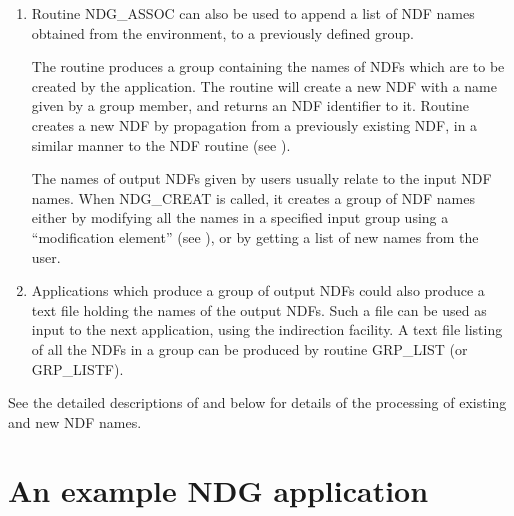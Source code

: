 \documentclass[twoside,11pt,nolof]{starlink}
\begin{document}
\begin{enumerate}
\item Routine NDG\_ASSOC can also be used to append a list of NDF names
obtained from the environment, to a previously defined group.

The routine  produces a group containing the names of
NDFs which are to be created by the application. The routine  will
create a new NDF with a name given by a group member, and returns an NDF
identifier to it. Routine  creates a new NDF by propagation from a
previously existing NDF, in a similar manner to the NDF routine  (see
).

The names of output NDFs given by users usually relate to the input NDF names.
When NDG\_CREAT is called, it creates a group of NDF names either by modifying
all the names in a specified input group using a ``modification element'' (see
), or by getting a list of new names from the user.

\item Applications which produce a group of output NDFs could also produce a
text file holding the names of the output NDFs. Such a file can be used
as input to the next application, using the indirection facility. A text
file listing of all the NDFs in a group can be produced by routine
GRP\_LIST (or GRP\_LISTF).

\end{enumerate}

See the detailed descriptions of  and  below for details
of the processing of existing and new NDF names.

\section{An example NDG application}
\end{document}
